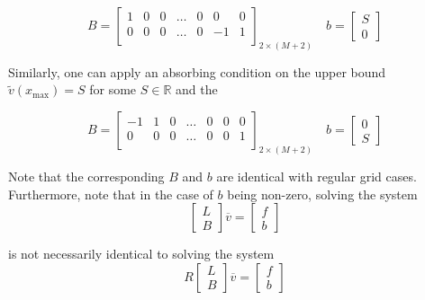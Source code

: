 \documentclass[11pt]{article}
\theoremstyle{definition}
\begin{document}
\begin{equation}\label{eq:absorbing-barrier-matrix}
B = \begin{bmatrix}
1 & 0 & 0 & \dots & 0 & 0 & 0 \\
0 & 0 & 0 & \dots & 0 & -1 & 1\\
\end{bmatrix}_{2 \times (M+2)} \quad
b = \begin{bmatrix}
S \\
0
\end{bmatrix}
\end{equation}

Similarly, one can apply an absorbing condition on the upper bound  $\tilde{v}(x_{\max}) =S$ for some $S \in \mathbb{R}$ and the


\begin{equation}\label{eq:absorbing-barrier-matrix-ub}
B = \begin{bmatrix}
-1 & 1 & 0 & \dots & 0 & 0 & 0 \\
0 & 0 & 0 & \dots & 0 & 0 & 1\\
\end{bmatrix}_{2 \times (M+2)} \quad
b = \begin{bmatrix}
0 \\
S
\end{bmatrix}
\end{equation}

Note that the corresponding $B$ and $b$ are identical with regular grid cases. Furthermore, note that in the case of $b$ being non-zero, solving the system 
\begin{equation}
\begin{bmatrix}
 L \\
 B
\end{bmatrix} 
\overline{v}
=
\begin{bmatrix}
f \\
b
\end{bmatrix}
\end{equation}

is not necessarily identical to solving the system
\begin{equation}
R \begin{bmatrix}
 L \\
 B
\end{bmatrix} 
\overline{v}
=
\begin{bmatrix}
f \\
b
\end{bmatrix}
\end{equation}
\end{document}
